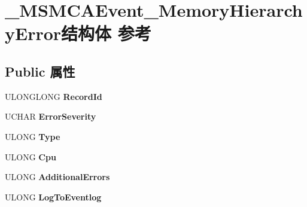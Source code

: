 \hypertarget{struct___m_s_m_c_a_event___memory_hierarchy_error}{}\section{\+\_\+\+M\+S\+M\+C\+A\+Event\+\_\+\+Memory\+Hierarchy\+Error结构体 参考}
\label{struct___m_s_m_c_a_event___memory_hierarchy_error}
\subsection*{Public 属性}
\begin{DoxyCompactItemize}
\item 
\mbox{\label{struct___m_s_m_c_a_event___memory_hierarchy_error_ae25bfb996862cbf022ae2789cd65d135}} 
U\+L\+O\+N\+G\+L\+O\+NG {\bfseries Record\+Id}
\item 
\mbox{\label{struct___m_s_m_c_a_event___memory_hierarchy_error_ac9c6003ff2c2791bf486d3681cc1de8d}} 
U\+C\+H\+AR {\bfseries Error\+Severity}
\item 
\mbox{\label{struct___m_s_m_c_a_event___memory_hierarchy_error_af464f9ebccd8652a058d34e591c21228}} 
U\+L\+O\+NG {\bfseries Type}
\item 
\mbox{\label{struct___m_s_m_c_a_event___memory_hierarchy_error_a75af1d7c2a5d489d0a38c86072a31eb0}} 
U\+L\+O\+NG {\bfseries Cpu}
\item 
\mbox{\label{struct___m_s_m_c_a_event___memory_hierarchy_error_a13c18cea3b8343c15032fea0f1bacacf}} 
U\+L\+O\+NG {\bfseries Additional\+Errors}
\item 
\mbox{\label{struct___m_s_m_c_a_event___memory_hierarchy_error_a0a40be2c24ac18a7b8b269bcc6d4f4d7}} 
U\+L\+O\+NG {\bfseries Log\+To\+Eventlog}
\item 
\mbox{\label{struct___m_s_m_c_a_event___memory_hierarchy_error_aa02585df7da3f2391ffb4db7106e10ad}} 

\end{DoxyCompactItemize}
